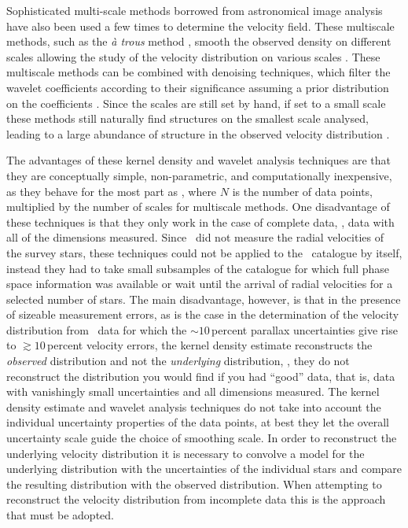 Sophisticated multi-scale methods borrowed from astronomical image
analysis have also been used a few times to determine the velocity
field. These multiscale methods, such as the \emph{{\`a} trous} method
\citep{Starck06}, smooth the observed density on different scales
allowing the study of the velocity distribution on various scales
\citep{1998A&A...340..384C,1999A&AS..135....5C}. These multiscale
methods can be combined with denoising techniques, which filter the
wavelet coefficients according to their significance assuming a prior
distribution on the coefficients \citep[\eg, Wiener
filtering,][]{Starck06}. Since the scales are still set by hand, if
set to a small scale these methods still naturally find structures on
the smallest scale analysed, leading to a large abundance of structure
in the observed velocity distribution \citep{2008A&A...490..135A}.

The advantages of these kernel density and wavelet analysis techniques
are that they are conceptually simple, non-parametric, and
computationally inexpensive, as they behave for the most part as
, where $N$ is the number of data points, multiplied by the
number of scales for multiscale methods. One disadvantage of these
techniques is that they only work in the case of complete data, \ie,
data with all of the dimensions measured. Since \Hipparcos\ did not
measure the radial velocities of the survey stars, these techniques
could not be applied to the \Hipparcos\ catalogue by itself, instead
they had to take small subsamples of the catalogue for which full
phase space information was available or wait until the arrival of
radial velocities for a selected number of stars. The main
disadvantage, however, is that in the presence of sizeable measurement
errors, as is the case in the determination of the velocity
distribution from \Hipparcos\ data for which the $\sim\!10$\,percent
parallax uncertainties give rise to $\gtrsim\!10$\,percent velocity
errors, the kernel density estimate reconstructs the \emph{observed}
distribution and not the \emph{underlying} distribution, \ie, they do
not reconstruct the distribution you would find if you had ``good''
data, that is, data with vanishingly small uncertainties and all
dimensions measured. The kernel density estimate and wavelet analysis
techniques do not take into account the individual uncertainty
properties of the data points, at best they let the overall
uncertainty scale guide the choice of smoothing scale. In order to
reconstruct the underlying velocity distribution it is necessary to
convolve a model for the underlying distribution with the
uncertainties of the individual stars and compare the resulting
distribution with the observed distribution. When attempting to
reconstruct the velocity distribution from incomplete data this is the
approach that must be adopted.

